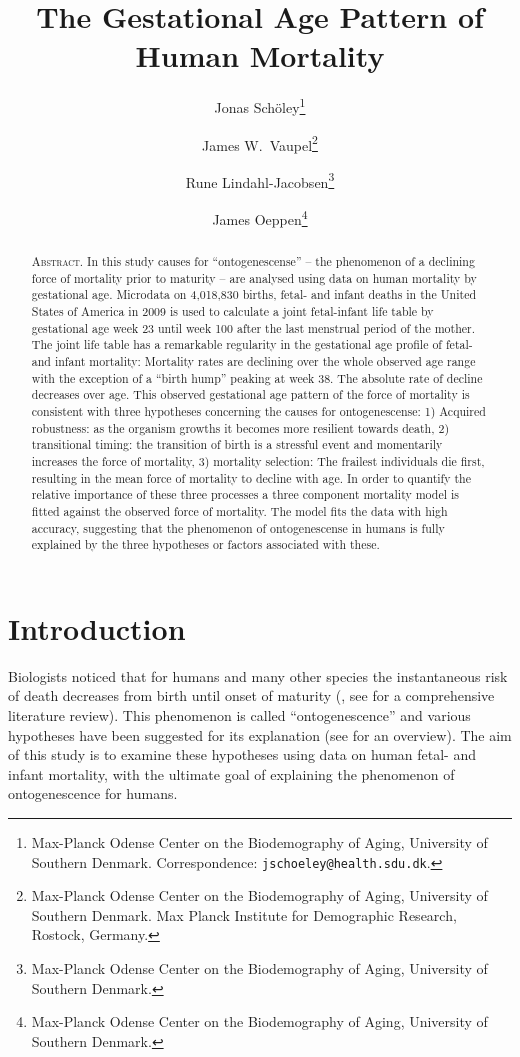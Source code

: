 \documentclass[12pt, parskip=half]{scrartcl}
\title{The Gestational Age Pattern of Human Mortality}
\author{
  Jonas Schöley\footnote{Max-Planck Odense Center on the Biodemography of Aging, University of Southern Denmark. Correspondence: \texttt{jschoeley@health.sdu.dk}.}
  \and
  James W.~Vaupel\footnote{Max-Planck Odense Center on the Biodemography of Aging, University of Southern Denmark. Max Planck Institute for Demographic Research, Rostock, Germany.}
  \and
  Rune Lindahl-Jacobsen\footnote{Max-Planck Odense Center on the Biodemography of Aging, University of Southern Denmark.}
  \and
  James Oeppen\footnote{Max-Planck Odense Center on the Biodemography of Aging, University of Southern Denmark.}
}
\begin{document}
\maketitle

\thispagestyle{empty}

\begin{abstract}
\textsc{Abstract.} In this study causes for \enquote{ontogenescense} -- the phenomenon of a declining force of mortality prior to maturity -- are analysed using data on human mortality by gestational age. Microdata on 4,018,830 births, fetal- and infant deaths in the United States of America in 2009 is used to calculate a joint fetal-infant life table by gestational age week 23 until week 100 after the last menstrual period of the mother. The joint life table has a remarkable regularity in the gestational age profile of fetal- and infant mortality: Mortality rates are declining over the whole observed age range with the exception of a \enquote{birth hump} peaking at week 38. The absolute rate of decline decreases over age. This observed gestational age pattern of the force of mortality is consistent with three hypotheses concerning the causes for ontogenescense: 1) Acquired robustness: as the organism growths it becomes more resilient towards death, 2) transitional timing: the transition of birth is a stressful event and momentarily increases the force of mortality, 3) mortality selection: The frailest individuals die first, resulting in the mean force of mortality to decline with age. In order to quantify the relative importance of these three processes a three component mortality model is fitted against the observed force of mortality. The model fits the data with high accuracy, suggesting that the phenomenon of ontogenescense in humans is fully explained by the three hypotheses or factors associated with these.
\end{abstract}

\clearpage


\section{Introduction} %
\label{sec:introduction}

Biologists noticed that for humans and many other species the instantaneous risk of death decreases from birth until onset of maturity (\cite{Medawar1952}, see \cite{Levitis2011} for a comprehensive literature review). This phenomenon is called \enquote{ontogenescence} and various hypotheses have been suggested for its explanation (see \cite{Levitis2011} for an overview). The aim of this study is to examine these hypotheses using data on human fetal- and infant mortality, with the ultimate goal of explaining the phenomenon of ontogenescence for humans.
\end{document}
